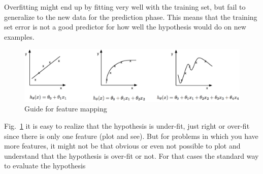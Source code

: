 Overfitting might end up by fitting very well with the training set, 
but fail to generalize to the new data for the prediction phase. 
This means that the training set error is not a good predictor for 
how well the hypothesis would do on new examples.

\begin{figure}
\begin{center}
\includegraphics[width=16cm]{figures/underOverFit}    %
\caption{Guide for feature mapping} 
\label{fig:underOverFit}
\end{center}
\end{figure}

Fig.~\ref{fig:underOverFit} it is easy to realize that the hypothesis is under-fit, 
just right or over-fit since there is only one feature (plot and see). 
But for problems in which you have more features, it might not be 
that obvious or even not possible to plot and understand that the
 hypothesis is over-fit or not. For that cases the standard way to 
 evaluate the hypothesis
 
